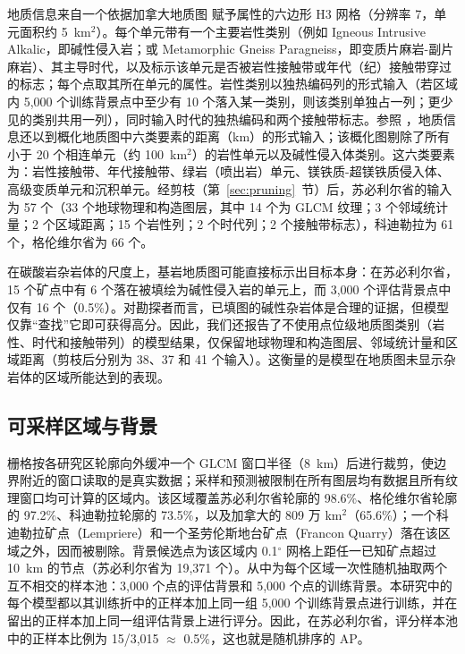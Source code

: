 \documentclass[pdflatex,sn-apa]{sn-jnl}
\begin{document}
地质信息来自一个依据加拿大地质图 \citep{Wheeler1996} 赋予属性的六边形 H3 网格（分辨率 7，单元面积约 5~km$^2$）。每个单元带有一个主要岩性类别（例如 Igneous Intrusive Alkalic，即碱性侵入岩；或 Metamorphic Gneiss Paragneiss，即变质片麻岩-副片麻岩）、其主导时代，以及标示该单元是否被岩性接触带或年代（纪）接触带穿过的标志；每个点取其所在单元的属性。岩性类别以独热编码列的形式输入（若区域内 5,000 个训练背景点中至少有 10 个落入某一类别，则该类别单独占一列；更少见的类别共用一列），同时输入时代的独热编码和两个接触带标志。参照 \citet{Luo2026}，地质信息还以到概化地质图中六类要素的距离（km）的形式输入；该概化图剔除了所有小于 20 个相连单元（约 100~km$^2$）的岩性单元以及碱性侵入体类别。这六类要素为：岩性接触带、年代接触带、绿岩（喷出岩）单元、镁铁质-超镁铁质侵入体、高级变质单元和沉积单元。经剪枝（第~\ref{sec:pruning}~节）后，苏必利尔省的输入为 57 个（33 个地球物理和构造图层，其中 14 个为 GLCM 纹理；3 个邻域统计量；2 个区域距离；15 个岩性列；2 个时代列；2 个接触带标志），科迪勒拉为 61 个，格伦维尔省为 66 个。

在碳酸岩杂岩体的尺度上，基岩地质图可能直接标示出目标本身：在苏必利尔省，15 个矿点中有 6 个落在被填绘为碱性侵入岩的单元上，而 3,000 个评估背景点中仅有 16 个（0.5\%）。对勘探者而言，已填图的碱性杂岩体是合理的证据，但模型仅靠“查找”它即可获得高分。因此，我们还报告了不使用点位级地质图类别（岩性、时代和接触带列）的模型结果，仅保留地球物理和构造图层、邻域统计量和区域距离（剪枝后分别为 38、37 和 41 个输入）。这衡量的是模型在地质图未显示杂岩体的区域所能达到的表现。

\subsection{可采样区域与背景}\label{sec:domain}

栅格按各研究区轮廓向外缓冲一个 GLCM 窗口半径（8~km）后进行裁剪，使边界附近的窗口读取的是真实数据；采样和预测被限制在所有图层均有数据且所有纹理窗口均可计算的区域内。该区域覆盖苏必利尔省轮廓的 98.6\%、格伦维尔省轮廓的 97.2\%、科迪勒拉轮廓的 73.5\%，以及加拿大的 809 万 km$^2$（65.6\%）；一个科迪勒拉矿点（Lempriere）和一个圣劳伦斯地台矿点（Francon Quarry）落在该区域之外，因而被剔除。背景候选点为该区域内 0.1$^\circ$ 网格上距任一已知矿点超过 10~km 的节点（苏必利尔省为 19,371 个）。从中为每个区域一次性随机抽取两个互不相交的样本池：3,000 个点的评估背景和 5,000 个点的训练背景。本研究中的每个模型都以其训练折中的正样本加上同一组 5,000 个训练背景点进行训练，并在留出的正样本加上同一组评估背景上进行评分。因此，在苏必利尔省，评分样本池中的正样本比例为 15/3,015 $\approx$ 0.5\%，这也就是随机排序的 AP。
\end{document}
